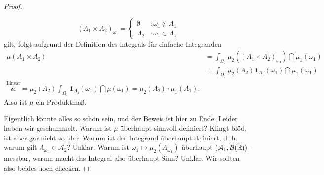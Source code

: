 \begin{proof}
\begin{enumerate}[label=(\roman*)]
	\[ (A_1\times A_2)_{\omega_1} = \begin{cases}
	\emptyset &:\omega_1 \notin A_1\\
	A_2 &:\omega_1 \in A_1
	\end{cases} \]
	gilt, folgt aufgrund der Definition des Integrals f\"ur einfache Integranden
	\begin{align*}
	\mu(A_1\times A_2) &= \int_{\Omega_1} \mu_2((A_1\times A_2)_{\omega_1}) \dint\mu_1(\omega_1)\\
	& = \int_{\Omega_1} \mu_2(A_2) \mathbf{1}_{A_1}(\omega_1) \dint\mu_1(\omega_1) \\
	\overset{\text{Linear}}&{=} \mu_2(A_2) \int_{\Omega_1} \mathbf{1}_{A_1}(\omega_1) \dint\mu(\omega_1) =  \mu_2(A_2) \cdot \mu_1(A_1).
	\end{align*}
	Also ist $\mu$ ein Produktma\ss.
	\end{enumerate}
Eigentlich k\"onnte alles so sch\"on sein, und der Beweis ist hier zu Ende. Leider haben wir geschummelt. Warum ist $\mu$ \"uberhaupt sinnvoll definiert? Klingt bl\"od, ist aber gar nicht so klar. Warum ist der Integrand \"uberhaupt definiert, d. h. warum gilt $A_{\omega_1}\in \mathcal A_2$? Unklar. Warum ist $\omega_1\mapsto \mu_2(A_{\omega_1})$ \"uberhaupt $(\mathcal A_1,\mathcal B(\overline{\mathbb{R}}))$-messbar, warum macht das Integral also \"uberhaupt Sinn? Unklar. Wir sollten also beides noch checken.\smallskip


\end{proof}
